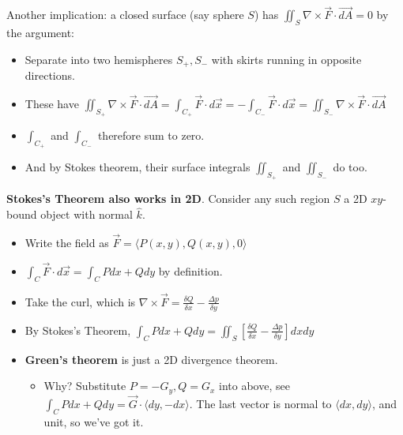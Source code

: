 \documentclass[11pt, oneside]{article}   	%
\begin{document}
Another implication: a closed surface (say sphere $S$) has $ \iint_S \nabla \times \vec{F} \cdot \vec{dA}  = 0$ by the argument:
\begin{itemize}
\item Separate into two hemispheres $S_+, S_-$ with skirts running in opposite directions.
\item These have $\iint_{S_+}  \nabla \times \vec{F} \cdot \vec{dA} = \int_{C_+} \vec{F}\cdot d\vec{x} = - \int_{C_-} \vec{F}\cdot d\vec{x} = \iint_{S_-} \nabla \times \vec{F} \cdot \vec{dA}$
\item $\int_{C_+}$ and $\int_{C_-}$ therefore sum to zero.
\item And by Stokes theorem, their surface integrals $\iint_{S_+}$ and $\iint_{S_-}$ do too.
\end{itemize}

\textbf{Stokes's Theorem also works in 2D}.  Consider any such region $S$ a 2D $xy$-bound object with normal $\hat{k}$. 
\begin{itemize}
\item Write the field as $\vec{F} = \langle P(x,y), Q(x,y), 0 \rangle$
\item $\int_C \vec{F} \cdot d\vec{x} = \int_C P dx + Qdy$ by definition.
\item Take the curl, which is $\nabla \times \vec{F} = \frac{\delta Q}{\delta x} -  \frac{\Delta p}{\delta y}$
\item By Stokes's Theorem, $ \int_C P dx + Qdy = \iint_S [\frac{\delta Q}{\delta x} -  \frac{\Delta p}{\delta y}]dxdy$
\item \textbf{Green's theorem}  is just a 2D divergence theorem.
\begin{itemize}
\item Why? Substitute $P = -G_y, Q = G_x$ into above, see $\int_C P dx + Q dy = \vec{G} \cdot \langle dy, -dx \rangle$.  The last vector is normal to $\langle dx, dy \rangle$, and unit, so we've got it. 
\end{itemize}
\end{itemize}
\end{document}

